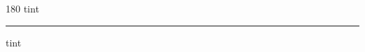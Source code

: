 
\begin{frame}
\begin{center}
\begin{turn}{180}
{\fontsize{2.5cm}{1em}\selectfont tint}
\end{turn}
\vspace{1em}\par  
\hrule
\vspace{1em}\par  
{\fontsize{2.5cm}{1em}\selectfont tint}
\end{center}
\end{frame}
